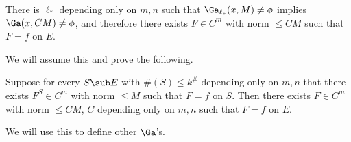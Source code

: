 
\begin{thm}
There is $\ell_*$ depending only on $m,n$ such that
$\Ga_{\ell_*}(x,M)\ne \phi$ implies $\Ga(x,CM)\ne \phi$, and therefore there exists $F\in C^m$ with norm $\le CM$ such that $F=f$ on $E$.
\end{thm}
We will assume this and prove the following.
\begin{thm*}%
Suppose for every $S\sub E$ with $\#(S)\le k^\#$ depending only on $m,n$ that there exists $F^S\in C^m$ with norm $\le M$ such that $F=f$ on $S$. Then there exists $F\in C^m$ with norm $\le CM$, $C$ depending only on $m,n$ such that $F=f$ on $E$. 
\end{thm*}
We will use this to define other $\Ga$'s.

